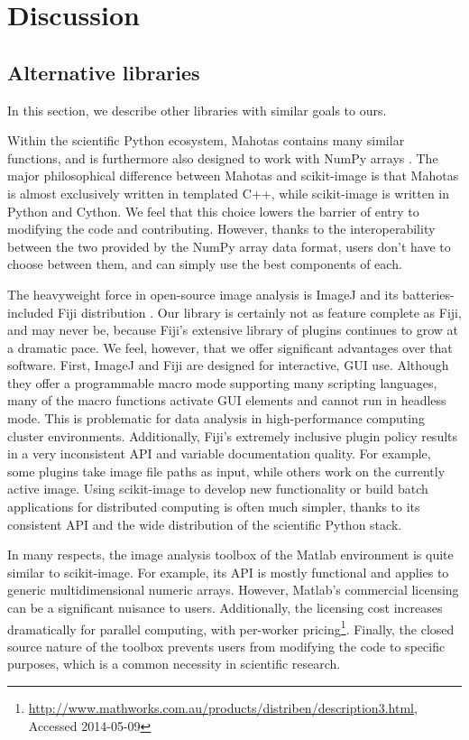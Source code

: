 
\section*{Discussion}
  \label{sec:discussion}

  \subsection*{Alternative libraries}

  In this section, we describe other libraries with similar goals to ours.
  
  Within the scientific Python ecosystem, Mahotas contains many similar
  functions, and is furthermore also designed to work with NumPy arrays
  \citep{Mahotas}. The major philosophical difference between Mahotas and
  scikit-image is that Mahotas is almost exclusively written in templated C++,
  while scikit-image is written in Python and Cython. We feel that this choice
  lowers the barrier of entry to modifying the code and contributing. However,
  thanks to the interoperability between the two provided by the NumPy array
  data format, users don't have to choose between them, and can simply use the
  best components of each.

  The heavyweight force in open-source image analysis is ImageJ and its
  batteries-included Fiji distribution \citep{Fiji}. Our library is
  certainly not as feature complete as Fiji, and may never be, because Fiji's
  extensive library of plugins continues to grow at a dramatic pace. We feel,
  however, that we offer significant advantages over that software. First,
  ImageJ and Fiji are designed for interactive, GUI use. Although they offer a
  programmable macro mode supporting many scripting languages, many of the
  macro functions activate GUI elements and cannot run in headless mode. This
  is problematic for data analysis in high-performance computing cluster
  environments. Additionally, Fiji's extremely inclusive plugin policy results
  in a very inconsistent API and variable documentation quality. For example,
  some plugins take image file paths as input, while others work on the
  currently active image. Using scikit-image to develop new functionality or
  build batch applications for distributed computing is often much simpler,
  thanks to its consistent API and the wide distribution of the scientific
  Python stack.

  In many respects, the image analysis toolbox of the Matlab environment is
  quite similar to scikit-image. For example, its API is mostly functional and
  applies to generic multidimensional numeric arrays. However, Matlab's
  commercial licensing can be a significant nuisance to users. Additionally,
  the licensing cost increases dramatically for parallel computing, with
  per-worker pricing\footnote{\url{http://www.mathworks.com.au/products/distriben/description3.html}, Accessed 2014-05-09}.
  Finally, the closed source nature of the toolbox prevents users from
  modifying the code to specific purposes, which is a common necessity in
  scientific research.

